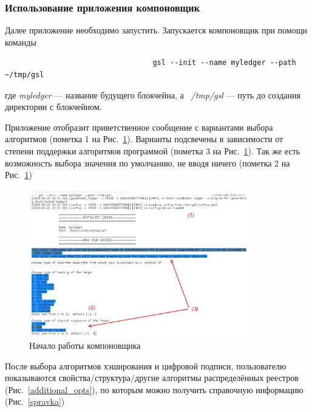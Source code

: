 \subsubsection{Использование приложения компоновщик}
Далее приложение необходимо запустить. Запускается компоновщик при помощи команды

\begin{center}
\begin{verbatim}
                                  gsl --init --name myledger --path ~/tmp/gsl
\end{verbatim}
\end{center}

где \emph{myledger} --- название будущего блокчейна, а \emph{~/tmp/gsl} ---
путь до создания директории с блокчейном.

Приложение отобразит приветственное сообщение с вариантами выбора алгоритмов
(пометка 1 на Рис.~\ref{algs_choose}).  Варианты подсвечены в зависимости от
степени поддержки алгоритмов программой (пометка 3 на Рис.~\ref{algs_choose}).
Так же есть возможность выбора значения по умолчанию, не вводя ничего (пометка
2 на Рис.~\ref{algs_choose})

\begin{figure}[h!]
    \centering
    \includegraphics[width=0.85\textwidth]{./screenshots/algs_choose}
    \caption{Начало работы компоновщика}\label{algs_choose}
\end{figure}

После выбора алгоритмов хэширования и цифровой подписи, пользователю
показываются свойства/структура/другие алгоритмы распределённых реестров (Рис.~\ref{additional_opts}), по
которым можно получить справочную информацию (Рис.~\ref{spravka})

